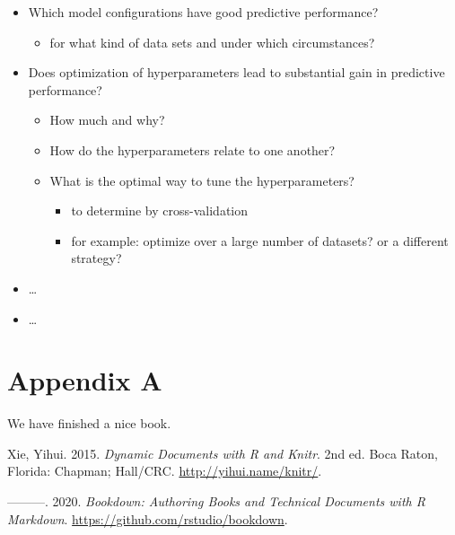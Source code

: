 \documentclass[
]{book}
\providecommand{\tightlist}{%
  \setlength{\itemsep}{0pt}\setlength{\parskip}{0pt}}
\newlength{\cslhangindent}
\newenvironment{cslreferences}%
  {\setlength{\parindent}{0pt}%
  \everypar{\setlength{\hangindent}{\cslhangindent}}\ignorespaces}%
  {\par}
\begin{document}
\begin{itemize}
\tightlist
\item
  Which model configurations have good predictive performance?

  \begin{itemize}
  \tightlist
  \item
    for what kind of data sets and under which circumstances?
  \end{itemize}
\item
  Does optimization of hyperparameters lead to substantial gain in predictive performance?

  \begin{itemize}
  \tightlist
  \item
    How much and why?
  \item
    How do the hyperparameters relate to one another?
  \item
    What is the optimal way to tune the hyperparameters?

    \begin{itemize}
    \tightlist
    \item
      to determine by cross-validation
    \item
      for example: optimize over a large number of datasets? or a different strategy?
    \end{itemize}
  \end{itemize}
\item
  \ldots{}
\item
  \ldots{}
\end{itemize}

\hypertarget{appendix-appendix}{%
\appendix}


\hypertarget{appendix-a}{%
\chapter{Appendix A}\label{appendix-a}}

We have finished a nice book.

\hypertarget{refs}{}
\begin{cslreferences}
\leavevmode\hypertarget{ref-xie2015}{}%
Xie, Yihui. 2015. \emph{Dynamic Documents with R and Knitr}. 2nd ed. Boca Raton, Florida: Chapman; Hall/CRC. \url{http://yihui.name/knitr/}.

\leavevmode\hypertarget{ref-R-bookdown}{}%
---------. 2020. \emph{Bookdown: Authoring Books and Technical Documents with R Markdown}. \url{https://github.com/rstudio/bookdown}.
\end{cslreferences}
\end{document}
